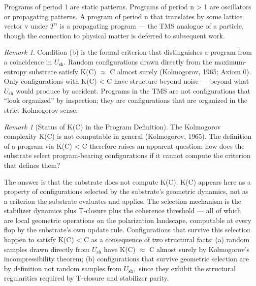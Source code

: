 \documentclass[11pt,oneside]{report}
\theoremstyle{definition}
\theoremstyle{remark}
\newtheorem{remark}[theorem]{Remark}
\begin{document}
Programs of period 1 are static patterns. Programs of period n
\textgreater{} 1 are oscillators or propagating patterns. A program of
period n that translates by some lattice vector v under \ensuremath{T^{n}} is a
propagating program --- the TMS analogue of a particle, though the
connection to physical matter is deferred to subsequent work.

\begin{remark}
Condition (b) is the formal criterion that distinguishes a
program from a coincidence in \ensuremath{U_{\mathrm{sh}}.} Random configurations drawn directly
from the maximum-entropy substrate satisfy K(C) \ensuremath{\approx} \textbar C\textbar{}
almost surely (Kolmogorov, 1965; Axiom 0). Only configurations with K(C)
\textless{} \textbar C\textbar{} have structure beyond noise --- beyond
what \ensuremath{U_{\mathrm{sh}}} would produce by accident. Programs in the TMS are not
configurations that ``look organized'' by inspection; they are
configurations that are organized in the strict Kolmogorov sense.
\end{remark}

\begin{remark}[Status of K(C) in the Program Definition]
The
Kolmogorov complexity K(C) is not computable in general (Kolmogorov,
1965). The definition of a program via K(C) \textless{}
\textbar C\textbar{} therefore raises an apparent question: how does the
substrate select program-bearing configurations if it cannot compute the
criterion that defines them?
\end{remark}

The answer is that the substrate does not compute K(C). K(C) appears
here as a property of configurations selected by the substrate's
geometric dynamics, not as a criterion the substrate evaluates and
applies. The selection mechanism is the stabilizer dynamics plus
T-closure plus the coherence threshold --- all of which are local
geometric operations on the polarization landscape, computable at every
flop by the substrate's own update rule. Configurations that survive
this selection happen to satisfy K(C) \textless{} \textbar C\textbar{}
as a consequence of two structural facts: (a) random samples drawn
directly from \ensuremath{U_{\mathrm{sh}}} have K(C) \ensuremath{\approx} \textbar C\textbar{} almost surely by
Kolmogorov's incompressibility theorem; (b) configurations that survive
geometric selection are by definition not random samples from \ensuremath{U_{\mathrm{sh}},} since
they exhibit the structural regularities required by T-closure and
stabilizer parity.
\end{document}
